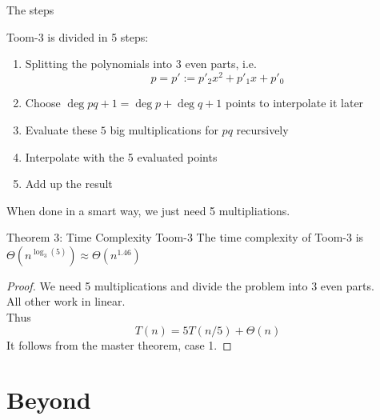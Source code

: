 \documentclass[12pt]{beamer}
\begin{document}
\begin{frame}{The steps}

Toom-3 is divided in 5 steps:
\pause
\begin{enumerate}
\item Splitting the polynomials into $3$ even parts, i.e.
\[
p = p' := p'_2 x^2 + p'_1 x + p'_0
\]
\pause
\item Choose $\deg{pq}+1 = \deg{p}+\deg{q}+1$ points to interpolate it later
\pause
\item Evaluate these $5$ big multiplications for $pq$ recursively
\pause
\item Interpolate with the 5 evaluated points
\pause
\item Add up the result
\end{enumerate}
\pause
When done in a smart way, we just need 5 multipliations.
\end{frame}

\begin{frame}{}
\begin{block}{Theorem 3: Time Complexity Toom-3}
The time complexity of Toom-3 is $\Theta(n^{\log_3(5)}) \approx \Theta(n^{1.46})$
\end{block}
\pause
\begin{proof}
We need 5 multiplications and divide the problem into 3 even parts.\\
All other work in linear.\\
Thus
\[
T(n) = 5T(n/5) + \Theta(n)
\]
It follows from the master theorem, case 1.
\end{proof}
\end{frame}

\section{Beyond}
\end{document}
